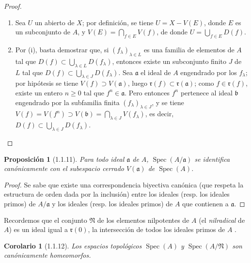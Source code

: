 \documentclass[oneside]{amsart}
\theoremstyle{ega-env-style}
\theoremstyle{ega-thm-env-style}
\newtheorem*{proposition}{Proposición}
\newtheorem*{corollary}{Corolario}
\theoremstyle{ega-defn-env-style}
\def\geq{\geqslant}                 %
\let\EGAOriginalLabel\label
\renewcommand{\label}[1]{\phantomsection\EGAOriginalLabel{#1}}
\begin{document}
\begin{proof}
\medskip\noindent
\begin{enumerate}
  \item[(i)] Sea $U$ un abierto de $X$;
    por definición, se tiene $U=X-V(E)$, donde $E$ es un subconjunto de $A$, y $V(E)=\bigcap_{f\in E}V(f)$, de donde $U=\bigcup_{f\in E}D(f)$.
  \item[(ii)] Por (i), basta demostrar que, si $(f_\lambda)_{\lambda\in L}$ es una familia de elementos de $A$ tal que $D(f)\subset\bigcup_{\lambda\in L}D(f_\lambda)$, entonces existe un subconjunto finito $J$ de $L$ tal que $D(f)\subset\bigcup_{\lambda\in J}D(f_\lambda)$.
    Sea $\mathfrak{a}$ el ideal de $A$ engendrado por los $f_\lambda$;
    por hipótesis se tiene $V(f)\supset V(\mathfrak{a})$, luego $\mathfrak{r}(f)\subset\mathfrak{r}(\mathfrak{a})$;
    como $f\in\mathfrak{r}(f)$, existe un entero $n\geq0$ tal que $f^n\in\mathfrak{a}$.
    Pero entonces $f^n$ pertenece al ideal $\mathfrak{b}$ engendrado por la subfamilia finita $(f_\lambda)_{\lambda\in J}$, y se tiene $V(f)=V(f^n)\supset V(\mathfrak{b})=\bigcap_{\lambda\in J}V(f_\lambda)$, es decir, $D(f)\subset\bigcup_{\lambda\in J}D(f_\lambda)$.
\end{enumerate}
\end{proof}

\begin{proposition}[1.1.11]
\label{I.1.1.11}
Para todo ideal $\mathfrak{a}$ de $A$, $\operatorname{Spec}(A/\mathfrak{a})$ se identifica canónicamente con el subespacio cerrado $V(\mathfrak{a})$ de $\operatorname{Spec}(A)$.
\end{proposition}

\begin{proof}
Se sabe que existe una correspondencia biyectiva canónica (que respeta la estructura de orden dada por la inclusión) entre los ideales (resp. los ideales primos) de $A/\mathfrak{a}$ y los ideales (resp. los ideales primos) de $A$ que contienen a $\mathfrak{a}$.
\end{proof}

Recordemos que el conjunto $\mathfrak{N}$ de los elementos nilpotentes de $A$ (el \emph{nilradical} de $A$) es un ideal igual a $\mathfrak{r}(0)$, la intersección de todos los ideales primos de $A$ .

\begin{corollary}[1.1.12]
\label{I.1.1.12}
Los espacios topológicos $\operatorname{Spec}(A)$ y $\operatorname{Spec}(A/\mathfrak{N})$ son canónicamente homeomorfos.
\end{corollary}
\end{document}
